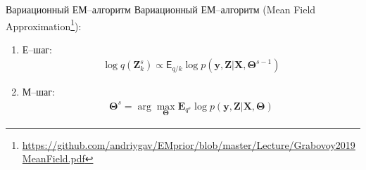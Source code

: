 \documentclass[9pt,pdf,hyperref={unicode}]{beamer}
\begin{document}
\begin{frame}{Вариационный ЕМ--алгоритм}
	Вариационный ЕМ--алгоритм (Mean Field Approximation\footnote{\url{https://github.com/andriygav/EMprior/blob/master/Lecture/Grabovoy2019MeanField.pdf}}):
	\begin{enumerate}
		\item Е--шаг: 
			\begin{equation}
			\label{sl:1:eq:5}
				\begin{aligned}
					\log q\left(\textbf{Z}_{k}^{s}\right) \propto \mathsf{E}_{q/k}\log p\left(\textbf{y}, \textbf{Z}|\textbf{X},\bm{\Theta}^{s-1}\right)
				\end{aligned}
			\end{equation}
		\item М--шаг: 
			\begin{equation}
			\label{sl:1:eq:6}
				\begin{aligned}
					\bm{\Theta}^{s} = \arg\max_{\bm{\Theta}} \mathbf{E}_{q^{s}}\log p\left(\textbf{y}, \textbf{Z}|\textbf{X},\bm{\Theta}\right)
				\end{aligned}
			\end{equation}
	\end{enumerate}

\end{frame}
\end{document}

